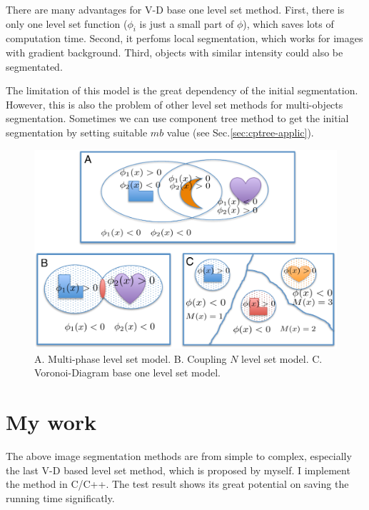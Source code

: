 There are many advantages for V-D base one level set method. First, there is only one level set function ($\phi_i$ is just a small part of $\phi$), which saves lots of computation time. Second, it perfoms local segmentation, which works for images with gradient background. Third, objects with similar intensity could also be segmentated.

The limitation of this model is the great dependency of the initial segmentation. However, this is also the problem of other level set methods for multi-objects segmentation. Sometimes we can use component tree method to get the initial segmentation by setting suitable $mb$ value (see Sec.\ref{sec:cptree-applic}).

\begin{figure}[htbp]
\centering
\includegraphics[width=1.0\textwidth]{images/imgseg_multiobjs}
\caption[The level set model of multi-objects segmentation]{A. Multi-phase level set model. B. Coupling $N$ level set model. C. Voronoi-Diagram base one level set model.}
\label{fig:imgseg-multiobjs}
\end{figure}
\section{My work}
The above image segmentation methods are from simple to complex, especially the last V-D based level set method, which is proposed by myself. I implement the method in C/C++. The test result shows its great potential on saving the running time significatly.
